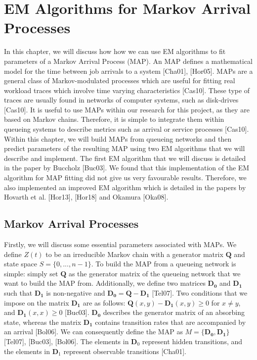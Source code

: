 \documentclass[a4paper,11pt,titlepage]{article}
\begin{document}
\section{EM Algorithms for Markov Arrival Processes}

In this chapter, we will discuss how how we can use EM algorithms to fit parameters of a Markov Arrival Process (MAP). An MAP defines a mathematical model for the time between job arrivals to a system [Cha01], [Hor05]. MAPs are a general class of Markov-modulated processes which are useful for fitting real workload traces which involve time varying characteristics [Cas10]. These type of traces are usually found in networks of computer systems, such as disk-drives [Cas10]. It is useful to use MAPs within our research for this project, as they are based on Markov chains. Therefore, it is simple to integrate them within queueing systems to describe metrics such as arrival or service processes [Cas10].\\

Within this chapter, we will build MAPs from queueing networks and then predict parameters of the resulting MAP using two EM algorithms that we will describe and implement. The first EM algorithm that we will discuss is detailed in the paper by Buccholz [Buc03]. We found that this implementation of the EM algorithm for MAP fitting did not give us very favourable results. Therefore, we also implemented an improved EM algorithm which is detailed in the papers by Hovarth et al. [Hor13], [Hor18] and Okamura [Oka08]. 

\subsection{Markov Arrival Processes}

Firstly, we will discuss some essential parameters associated with MAPs. We define $Z(t)$ to be an irreducible Markov chain with a generator matrix $\mathbf{Q}$ and state space $S = \{0,...,n-1\}$. To build the MAP from a queueing network is simple: simply set $\mathbf{Q}$ as the generator matrix of the queueing network that we want to build the MAP from. Additionally, we define two matrices $\mathbf{D_0}$ and $\mathbf{D_1}$ such that $\mathbf{D_1}$ is non-negative and $\mathbf{D_0} = \mathbf{Q} - \mathbf{D_1}$ [Tel07]. Two conditions that we impose on the matrix $\mathbf{D_1}$ are as follows: $\mathbf{Q}(x,y) - \mathbf{D_1}(x,y) \geq 0$ for $x \neq y$, and $\mathbf{D_1}(x,x) \geq 0$ [Buc03]. $\mathbf{D_0}$ describes the generator matrix of an absorbing state, whereas the matrix $\mathbf{D_1}$ contains transition rates that are accompanied by an arrival [Bol06]. We can consequently define the MAP as $M = \{\mathbf{D_0}, \mathbf{D_1}\}$ [Tel07], [Buc03], [Bol06]. The elements in $\mathbf{D}_0$ represent hidden transitions, and the elements in $\mathbf{D}_1$ represent observable transitions [Cha01]. \\
\end{document}
